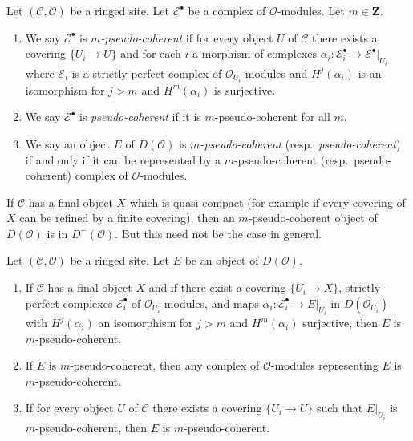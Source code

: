 \begin{definition}
\label{definition-pseudo-coherent}
Let $(\mathcal{C}, \mathcal{O})$ be a ringed site. Let $\mathcal{E}^\bullet$
be a complex of $\mathcal{O}$-modules. Let $m \in \mathbf{Z}$.
\begin{enumerate}
\item We say $\mathcal{E}^\bullet$ is {\it $m$-pseudo-coherent}
if for every object $U$ of $\mathcal{C}$ there exists a covering
$\{U_i \to U\}$ and for each $i$ a morphism of complexes
$\alpha_i : \mathcal{E}_i^\bullet \to \mathcal{E}^\bullet|_{U_i}$
where $\mathcal{E}_i$ is a strictly perfect complex of
$\mathcal{O}_{U_i}$-modules and $H^j(\alpha_i)$ is an isomorphism
for $j > m$ and $H^m(\alpha_i)$ is surjective.
\item We say $\mathcal{E}^\bullet$ is {\it pseudo-coherent}
if it is $m$-pseudo-coherent for all $m$.
\item We say an object $E$ of $D(\mathcal{O})$ is
{\it $m$-pseudo-coherent} (resp.\ {\it pseudo-coherent})
if and only if it can be represented by a $m$-pseudo-coherent
(resp.\ pseudo-coherent) complex of $\mathcal{O}$-modules.
\end{enumerate}
\end{definition}

\noindent
If $\mathcal{C}$ has a final object $X$ which is quasi-compact
(for example if every covering of $X$ can be refined by a finite covering),
then an $m$-pseudo-coherent object of $D(\mathcal{O})$ is in
$D^-(\mathcal{O})$. But this need not be the case in general.

\begin{lemma}
\label{lemma-pseudo-coherent-independent-representative}
Let $(\mathcal{C}, \mathcal{O})$ be a ringed site.
Let $E$ be an object of $D(\mathcal{O})$.
\begin{enumerate}
\item If $\mathcal{C}$ has a final object $X$ and if there exist a covering
$\{U_i \to X\}$, strictly perfect complexes $\mathcal{E}_i^\bullet$ of
$\mathcal{O}_{U_i}$-modules, and
maps $\alpha_i : \mathcal{E}_i^\bullet \to E|_{U_i}$ in
$D(\mathcal{O}_{U_i})$ with $H^j(\alpha_i)$ an isomorphism for $j > m$
and $H^m(\alpha_i)$ surjective, then $E$ is $m$-pseudo-coherent.
\item If $E$ is $m$-pseudo-coherent, then any complex of $\mathcal{O}$-modules
representing $E$ is $m$-pseudo-coherent.
\item If for every object $U$ of $\mathcal{C}$ there exists a covering
$\{U_i \to U\}$ such that $E|_{U_i}$ is $m$-pseudo-coherent, then
$E$ is $m$-pseudo-coherent.
\end{enumerate}
\end{lemma}

